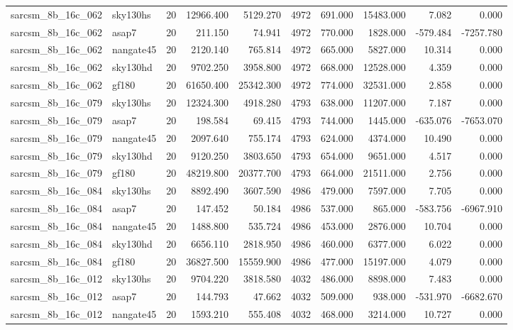 \documentclass{article}
\begin{document}
\begin{longtable}{llrrrrrrrr}
sarcsm\_8b\_16c\_062 & sky130hs & 20 & 12966.400 & 5129.270 & 4972 & 691.000 & 15483.000 & 7.082 & 0.000 \\
sarcsm\_8b\_16c\_062 & asap7 & 20 & 211.150 & 74.941 & 4972 & 770.000 & 1828.000 & -579.484 & -7257.780 \\
sarcsm\_8b\_16c\_062 & nangate45 & 20 & 2120.140 & 765.814 & 4972 & 665.000 & 5827.000 & 10.314 & 0.000 \\
sarcsm\_8b\_16c\_062 & sky130hd & 20 & 9702.250 & 3958.800 & 4972 & 668.000 & 12528.000 & 4.359 & 0.000 \\
sarcsm\_8b\_16c\_062 & gf180 & 20 & 61650.400 & 25342.300 & 4972 & 774.000 & 32531.000 & 2.858 & 0.000 \\
sarcsm\_8b\_16c\_079 & sky130hs & 20 & 12324.300 & 4918.280 & 4793 & 638.000 & 11207.000 & 7.187 & 0.000 \\
sarcsm\_8b\_16c\_079 & asap7 & 20 & 198.584 & 69.415 & 4793 & 744.000 & 1445.000 & -635.076 & -7653.070 \\
sarcsm\_8b\_16c\_079 & nangate45 & 20 & 2097.640 & 755.174 & 4793 & 624.000 & 4374.000 & 10.490 & 0.000 \\
sarcsm\_8b\_16c\_079 & sky130hd & 20 & 9120.250 & 3803.650 & 4793 & 654.000 & 9651.000 & 4.517 & 0.000 \\
sarcsm\_8b\_16c\_079 & gf180 & 20 & 48219.800 & 20377.700 & 4793 & 664.000 & 21511.000 & 2.756 & 0.000 \\
sarcsm\_8b\_16c\_084 & sky130hs & 20 & 8892.490 & 3607.590 & 4986 & 479.000 & 7597.000 & 7.705 & 0.000 \\
sarcsm\_8b\_16c\_084 & asap7 & 20 & 147.452 & 50.184 & 4986 & 537.000 & 865.000 & -583.756 & -6967.910 \\
sarcsm\_8b\_16c\_084 & nangate45 & 20 & 1488.800 & 535.724 & 4986 & 453.000 & 2876.000 & 10.704 & 0.000 \\
sarcsm\_8b\_16c\_084 & sky130hd & 20 & 6656.110 & 2818.950 & 4986 & 460.000 & 6377.000 & 6.022 & 0.000 \\
sarcsm\_8b\_16c\_084 & gf180 & 20 & 36827.500 & 15559.900 & 4986 & 477.000 & 15197.000 & 4.079 & 0.000 \\
sarcsm\_8b\_16c\_012 & sky130hs & 20 & 9704.220 & 3818.580 & 4032 & 486.000 & 8898.000 & 7.483 & 0.000 \\
sarcsm\_8b\_16c\_012 & asap7 & 20 & 144.793 & 47.662 & 4032 & 509.000 & 938.000 & -531.970 & -6682.670 \\
sarcsm\_8b\_16c\_012 & nangate45 & 20 & 1593.210 & 555.408 & 4032 & 468.000 & 3214.000 & 10.727 & 0.000 \\

\end{longtable}
\end{document}
